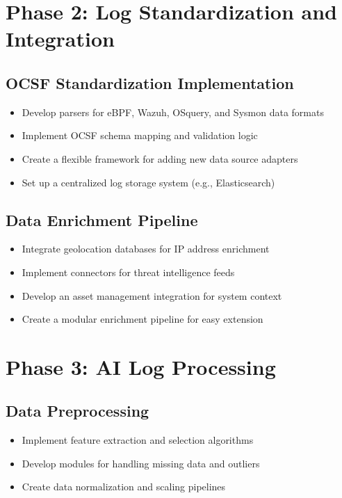 \section{Phase 2: Log Standardization and Integration}

\subsection{OCSF Standardization Implementation}
\begin{itemize}
    \item Develop parsers for eBPF, Wazuh, OSquery, and Sysmon data formats
    \item Implement OCSF schema mapping and validation logic
    \item Create a flexible framework for adding new data source adapters
    \item Set up a centralized log storage system (e.g., Elasticsearch)
\end{itemize}

\subsection{Data Enrichment Pipeline}
\begin{itemize}
    \item Integrate geolocation databases for IP address enrichment
    \item Implement connectors for threat intelligence feeds
    \item Develop an asset management integration for system context
    \item Create a modular enrichment pipeline for easy extension
\end{itemize}

\section{Phase 3: AI Log Processing}

\subsection{Data Preprocessing}
\begin{itemize}
    \item Implement feature extraction and selection algorithms
    \item Develop modules for handling missing data and outliers
    \item Create data normalization and scaling pipelines
\end{itemize}


